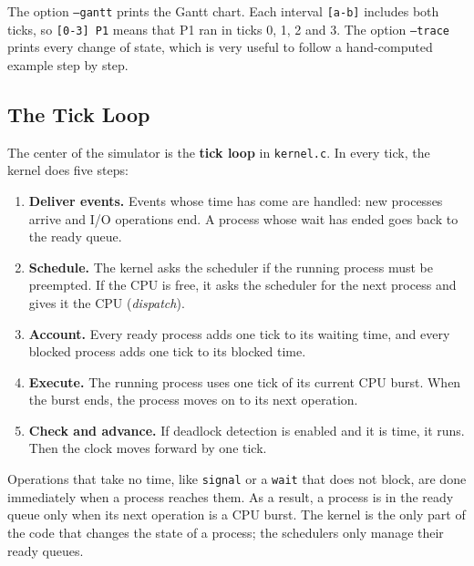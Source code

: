 The option \texttt{--gantt} prints the Gantt chart. Each interval \texttt{[a-b]} includes both ticks, so \texttt{[0-3] P1} means that P1 ran in ticks 0, 1, 2 and 3. The option \texttt{--trace} prints every change of state, which is very useful to follow a hand-computed example step by step.

\subsection{The Tick Loop}
The center of the simulator is the \textbf{tick loop} in \texttt{kernel.c}. In every tick, the kernel does five steps:
\begin{enumerate}
    \item \textbf{Deliver events.} Events whose time has come are handled: new processes arrive and I/O operations end. A process whose wait has ended goes back to the ready queue.
    \item \textbf{Schedule.} The kernel asks the scheduler if the running process must be preempted. If the CPU is free, it asks the scheduler for the next process and gives it the CPU (\emph{dispatch}).
    \item \textbf{Account.} Every ready process adds one tick to its waiting time, and every blocked process adds one tick to its blocked time.
    \item \textbf{Execute.} The running process uses one tick of its current CPU burst. When the burst ends, the process moves on to its next operation.
    \item \textbf{Check and advance.} If deadlock detection is enabled and it is time, it runs. Then the clock moves forward by one tick.
\end{enumerate}
Operations that take no time, like \texttt{signal} or a \texttt{wait} that does not block, are done immediately when a process reaches them. As a result, a process is in the ready queue only when its next operation is a CPU burst. The kernel is the only part of the code that changes the state of a process; the schedulers only manage their ready queues.

